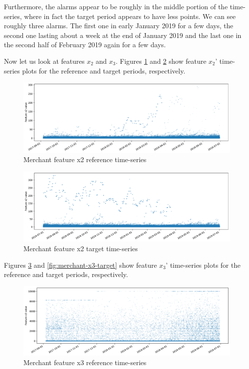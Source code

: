 Furthermore, the alarms appear to be roughly in the middle portion of the time-series, where in fact the target period appears to have less points. We can see roughly three alarms. The first one in early January 2019 for a few days, the second one lasting about a week at the end of January 2019 and the last one in the second half of February 2019 again for a few days.

Now let us look at features $x_2$ and $x_3$. Figures \ref{fig:merchant-x2-reference} and \ref{fig:merchant-x2-target} show feature $x_2$' time-series plots for the reference and target periods, respectively.
\begin{figure}[!htb]
    \begin{center}
      \includegraphics[scale=0.5]{figures/merchant-x2-reference.pdf}
      \caption{Merchant feature x2 reference time-series}
      \label{fig:merchant-x2-reference}
    \end{center}
\end{figure}
\begin{figure}[!htb]
    \begin{center}
      \includegraphics[scale=0.5]{figures/merchant-x2-target.pdf}
      \caption{Merchant feature x2 target time-series}
      \label{fig:merchant-x2-target}
    \end{center}
\end{figure}
Figures \ref{fig:merchant-x3-reference} and \ref{fig:merchant-x3-target} show feature $x_3$' time-series plots for the reference and target periods, respectively.
\begin{figure}[!htb]
    \begin{center}
      \includegraphics[scale=0.5]{figures/merchant-x3-reference.pdf}
      \caption{Merchant feature x3 reference time-series}
      \label{fig:merchant-x3-reference}
    \end{center}
\end{figure}
